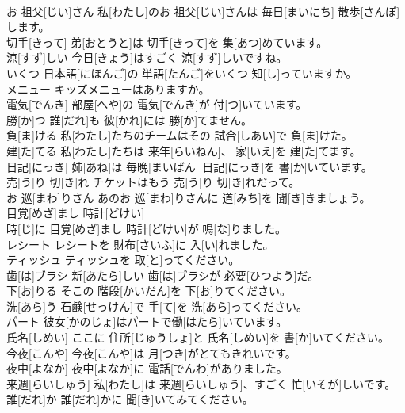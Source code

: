 \documentclass[8pt]{extreport}
\begin{document}
\begin{CJK}{UTF8}{min}
\\	お 祖父[じい]さん	私[わたし]のお 祖父[じい]さんは 毎日[まいにち] 散歩[さんぽ]します。		
\\	切手[きって]	弟[おとうと]は 切手[きって]を 集[あつ]めています。		
\\	涼[すず]しい	今日[きょう]はすごく 涼[すず]しいですね。		
\\	いくつ	日本語[にほんご]の 単語[たんご]をいくつ 知[し]っていますか。		
\\	メニュー	キッズメニューはありますか。		
\\	電気[でんき]	部屋[へや]の 電気[でんき]が 付[つ]いています。		
\\	勝[か]つ	誰[だれ]も 彼[かれ]には 勝[か]てません。		
\\	負[ま]ける	私[わたし]たちのチームはその 試合[しあい]で 負[ま]けた。		
\\	建[た]てる	私[わたし]たちは 来年[らいねん]、 家[いえ]を 建[た]てます。		
\\	日記[にっき]	姉[あね]は 毎晩[まいばん] 日記[にっき]を 書[か]いています。		
\\	売[う]り 切[き]れ	チケットはもう 売[う]り 切[き]れだって。		
\\	お 巡[まわ]りさん	あのお 巡[まわ]りさんに 道[みち]を 聞[き]きましょう。		
\\	目覚[めざ]まし 時計[どけい]	
\\	時[じ]に 目覚[めざ]まし 時計[どけい]が 鳴[な]りました。		
\\	レシート	レシートを 財布[さいふ]に 入[い]れました。		
\\	ティッシュ	ティッシュを 取[と]ってください。		
\\	歯[は]ブラシ	新[あたら]しい 歯[は]ブラシが 必要[ひつよう]だ。		
\\	下[お]りる	そこの 階段[かいだん]を 下[お]りてください。		
\\	洗[あら]う	石鹸[せっけん]で 手[て]を 洗[あら]ってください。		
\\	パート	彼女[かのじょ]はパートで働[はたら]いています。		
\\	氏名[しめい]	ここに 住所[じゅうしょ]と 氏名[しめい]を 書[か]いてください。		
\\	今夜[こんや]	今夜[こんや]は 月[つき]がとてもきれいです。		
\\	夜中[よなか]	夜中[よなか]に 電話[でんわ]がありました。		
\\	来週[らいしゅう]	私[わたし]は 来週[らいしゅう]、すごく 忙[いそが]しいです。		
\\	誰[だれ]か	誰[だれ]かに 聞[き]いてみてください。		

\end{CJK}
\end{document}
